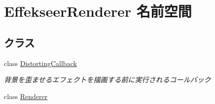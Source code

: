 \hypertarget{namespace_effekseer_renderer}{}\section{Effekseer\+Renderer 名前空間}
\label{namespace_effekseer_renderer}
\subsection*{クラス}
\begin{DoxyCompactItemize}
\item 
class \mbox{\hyperlink{class_effekseer_renderer_1_1_distorting_callback}{Distorting\+Callback}}
\begin{DoxyCompactList}\small\item\em 背景を歪ませるエフェクトを描画する前に実行されるコールバック \end{DoxyCompactList}\item 
class \mbox{\hyperlink{class_effekseer_renderer_1_1_renderer}{Renderer}}
\end{DoxyCompactItemize}
